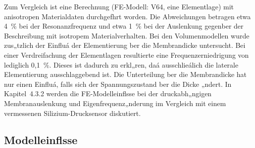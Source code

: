 Zum Vergleich ist eine Berechnung (FE-Modell: V64, eine Elementlage)
mit anisotropen Materialdaten \cite{LB82}
durchgefhrt worden. Die Abweichungen betragen etwa 4~\% bei der
Resonanzfrequenz und etwa 1~\% bei der Auslenkung gegenber der
Beschreibung mit isotropem Materialverhalten.
Bei den Volumenmodellen wurde
zus„tzlich der Einfluá der Elementierung ber die Membrandicke
untersucht. Bei einer Verdreifachung der Elementlagen resultierte
eine Frequenzerniedrigung von lediglich 0,1~\%. Dieses ist dadurch zu
erkl„ren, daá ausschlieálich die laterale Elementierung ausschlaggebend
ist. Die Unterteilung ber die Membrandicke hat nur einen Einfluá, falls
sich der Spannungszustand ber die Dicke „ndert. In Kapitel~4.3.2
werden die FE-Modelleinflsse bei der druckabh„ngigen Membranauslenkung
und Eigenfrequenz„nderung im Vergleich mit einem vermessenen
Silizium-Drucksensor diskutiert.


\subsection{Modelleinflsse}
\label{modelleinfluesse}

